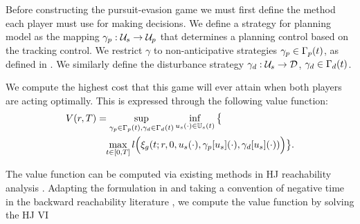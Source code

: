 Before constructing the pursuit-evasion game we must first define the method each player must use for making decisions. 
We define a strategy for planning model as the mapping $\gamma_{p} : \mathcal{U}_s \rightarrow \mathcal{U}_p$ that determines a planning control based on the tracking control. We restrict $\gamma$ to non-anticipative strategies $\gamma_{p} \in \Gamma_p(t)$, as defined in \cite{Mitchell05}. 
We similarly define the disturbance strategy $\gamma_{d}: \mathcal{U}_s \rightarrow \mathcal{D}$, $\gamma_{d} \in \Gamma_d(t)$.

We compute the highest cost that this game will ever attain when both players are acting optimally. 
This is expressed through the following value function:
\begin{align}
&V(\rstate,\thor)= \sup_{\gamma_{\pstate} \in \Gamma_\pstate(t), \gamma_{\dstb} \in \Gamma_\dstb(t)} \inf_{\tctrl(\cdot) \in \tcfset(t)} \big\{ \nonumber \\
&\qquad\qquad \max_{\tvar\in [0, \thor]} \errfunc\Big(\rtraj(\tvar; \rstate, 0, \tctrl(\cdot), \gamma_\pstate[\tctrl](\cdot), \gamma_\dstb[\tctrl](\cdot))\Big)\big\}. \label{eq:valfunc}
\end{align} 

The value function can be computed via existing methods in HJ reachability analysis \cite{Mitchell05, Fisac15}.
Adapting the formulation in \cite{Fisac15} and taking a convention of negative time in the backward reachability literature \cite{Chen2016DecouplingJournal, Chen2018}, we compute the value function by solving the HJ VI

